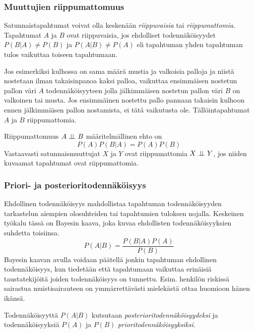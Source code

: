\subsubsection{Muuttujien riippumattomuus}
Satunnaistapahtumat voivat olla keskenään \emph{riippuvaisia} tai \emph{riippumattomia}. Tapahtumat $A$ ja $B$ ovat riippuvaisia, jos ehdolliset todennäköisyydet $P(B|A) \not= P(B)$ ja $P(A|B) \not= P(A)$ eli tapahtuman yhden tapahtuman tulos vaikuttaa toiseen tapahtumaan.

Jos esimerkiksi  kulhossa on sama määrä mustia ja valkoisia palloja ja niistä nostetaan ilman takaisinpanoa kaksi palloa, vaikuttaa ensimmäisen nostetun pallon väri $A$ todennäköisyyteen jolla jälkimmäisen nostetun pallon väri $B$ on valkoinen tai musta. Jos ensimmäinen nostettu pallo pannaan takaisin kulhoon ennen jälkimmäisen pallon nostamista, ei tätä vaikutusta ole. Tällöintapahtumat $A$ ja $B$ riippumattomia. 

Riippumattomuus $A \perp \!\!\! \perp B$ määritelmällinen ehto on
$$
    P(A)P(B|A) = P(A)P(B) 
$$ 
Vastaavasti satunnaismuuttujat $X$ ja $Y$ ovat riippumattomia $X \perp \!\!\! \perp Y$, jos niiden kuvaamat tapahtumat ovat riippumattomia. 



\subsubsection{Priori- ja posterioritodennäköisyys}
Ehdollinen todennäköisyys mahdollistaa  tapahtuman todennäköisyyden tarkastelun aiempien olosuhteiden tai tapahtumien tuloksen nojalla. Keskeinen työkalu tässä on Bayesin kaava, joka kuvaa ehdollisten todennäköisyyksien suhdetta toisiinsa.
$$
    P(A|B) = \frac{P(B|A)P(A)}{P(B)}
$$
Bayesin kaavan avulla voidaan päätellä jonkin tapahtuman ehdollinen todennäköisyys, kun tiedetään että tapahtumaan vaikuttaa erinäisiä taustatekijöitä joiden todennäköisyys on tunnettu. Esim. henkilön riskissä sairastua muistisairauteen on ymmärrettävästi mielekästä ottaa huomioon hänen ikänsä.

Todennäköisyyttä $P(A|B)$ kutsutaan \emph{posterioritodennäköisyydeksi} ja todennäköisyyksiä $P(A)$ ja $P(B)$ \emph{prioritodennäköisyyksiksi}.



 

